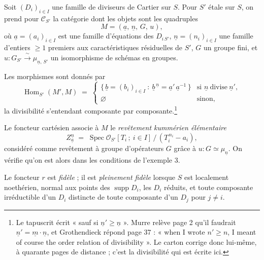 \documentclass[11pt,a4paper]{article}
\begin{document}
Soit $(D_{i})_{i \in I}$ une famille de diviseurs de Cartier sur $S$. Pour
$S'$ étale sur $S$, on prend pour $\mathcal{C}_{S'}$ la catégorie dont les
objets sont les quadruples
\[
  M = (\underline{a},\, \underline{n},\, G,\, u) ,
\]
où $\underline{a} = (a_{i})_{i \in I}$ est une famille d'équations des
$D_{i\,S'}$, $\underline{n} = (n_{i})_{i \in I}$ une famille d'entiers
$\geqslant 1$ premiers aux caractéristiques résiduelles de $S'$, $G$ un groupe
fini, et $u : G_{S'} \xrightarrow{\ \sim\ } \mu_{\underline{n},\,S'}$ un
isomorphisme de schémas en groupes.

Les morphismes sont donnés par
\[
  \operatorname{Hom}_{S'}(M', M) \;=\;
  \begin{cases}
    \bigl\{\, \underline{b} = (b_{i})_{i \in I} \ :\
      \underline{b}^{\,\underline{n}} =
      \underline{a}'\,\underline{a}^{-1} \,\bigr\}
      & \text{si } \underline{n} \ \text{divise}\ \underline{n}' , \\[2pt]
    \varnothing & \text{sinon} ,
  \end{cases}
\]
la divisibilité s'entendant composante par composante.\footnote{Le tapuscrit
écrit « sauf si $\underline{n}' \geqslant \underline{n}$ ». Murre relève page 2
qu'il faudrait $\underline{n}' = \underline{m}\cdot\underline{n}$, et
Grothendieck répond page 37 : « when I wrote $n' \geqslant n$, I meant of
course the order relation of divisibility ». Le carton corrige donc lui-même,
à quarante pages de distance ; c'est la divisibilité qui est écrite ici.}

Le foncteur cartésien associe à $M$ le \emph{revêtement kummérien élémentaire}
\[
  Z^{\underline{n}}_{\underline{a}} \;=\;
  \operatorname{Spec} \mathcal{O}_{S'}[T_{i}\,;\ i \in I]\,/\,
  (T_{i}^{\,n_{i}} - a_{i}) ,
\]
considéré comme revêtement à groupe d'opérateurs $G$ grâce à
$u : G \simeq \mu_{\underline{n}}$. On vérifie qu'on est alors dans les
conditions de l'exemple 3.

Le foncteur $r$ est \emph{fidèle} ; il est \emph{pleinement fidèle} lorsque
$S$ est localement noethérien, normal aux points des
$\operatorname{supp} D_{i}$, les $D_{i}$ réduits, et toute composante
irréductible d'un $D_{i}$ distincte de toute composante d'un $D_{j}$ pour
$j \neq i$.
\end{document}

